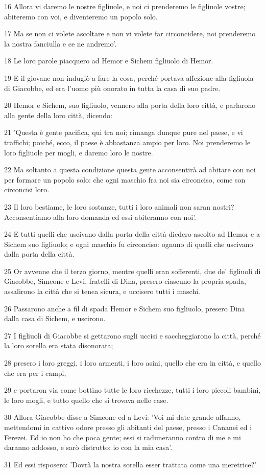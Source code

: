 \par 16 Allora vi daremo le nostre figliuole, e noi ci prenderemo le figliuole vostre; abiteremo con voi, e diventeremo un popolo solo.
\par 17 Ma se non ci volete ascoltare e non vi volete far circoncidere, noi prenderemo la nostra fanciulla e ce ne andremo'.
\par 18 Le loro parole piacquero ad Hemor e Sichem figliuolo di Hemor.
\par 19 E il giovane non indugiò a fare la cosa, perché portava affezione alla figliuola di Giacobbe, ed era l'uomo più onorato in tutta la casa di suo padre.
\par 20 Hemor e Sichem, suo figliuolo, vennero alla porta della loro città, e parlarono alla gente della loro città, dicendo:
\par 21 'Questa è gente pacifica, qui tra noi; rimanga dunque pure nel paese, e vi traffichi; poiché, ecco, il paese è abbastanza ampio per loro. Noi prenderemo le loro figliuole per mogli, e daremo loro le nostre.
\par 22 Ma soltanto a questa condizione questa gente acconsentirà ad abitare con noi per formare un popolo solo: che ogni maschio fra noi sia circonciso, come son circoncisi loro.
\par 23 Il loro bestiame, le loro sostanze, tutti i loro animali non saran nostri? Acconsentiamo alla loro domanda ed essi abiteranno con noi'.
\par 24 E tutti quelli che uscivano dalla porta della città diedero ascolto ad Hemor e a Sichem suo figliuolo; e ogni maschio fu circonciso: ognuno di quelli che uscivano dalla porta della città.
\par 25 Or avvenne che il terzo giorno, mentre quelli eran sofferenti, due de' figliuoli di Giacobbe, Simeone e Levi, fratelli di Dina, presero ciascuno la propria spada, assalirono la città che si tenea sicura, e uccisero tutti i maschi.
\par 26 Passarono anche a fil di spada Hemor e Sichem suo figliuolo, presero Dina dalla casa di Sichem, e uscirono.
\par 27 I figliuoli di Giacobbe si gettarono sugli uccisi e saccheggiarono la città, perché la loro sorella era stata disonorata;
\par 28 presero i loro greggi, i loro armenti, i loro asini, quello che era in città, e quello che era per i campi,
\par 29 e portaron via come bottino tutte le loro ricchezze, tutti i loro piccoli bambini, le loro mogli, e tutto quello che si trovava nelle case.
\par 30 Allora Giacobbe disse a Simeone ed a Levi: 'Voi mi date grande affanno, mettendomi in cattivo odore presso gli abitanti del paese, presso i Cananei ed i Ferezei. Ed io non ho che poca gente; essi si raduneranno contro di me e mi daranno addosso, e sarò distrutto: io con la mia casa'.
\par 31 Ed essi risposero: 'Dovrà la nostra sorella esser trattata come una meretrice?'

